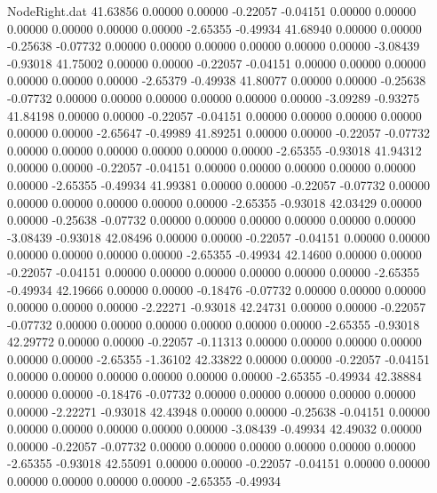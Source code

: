 \begin{filecontents}{NodeRight.dat}
  41.63856    0.00000    0.00000    -0.22057   -0.04151    0.00000    0.00000    0.00000    0.00000    0.00000    0.00000   -2.65355   -0.49934
  41.68940    0.00000    0.00000    -0.25638   -0.07732    0.00000    0.00000    0.00000    0.00000    0.00000    0.00000   -3.08439   -0.93018
  41.75002    0.00000    0.00000    -0.22057   -0.04151    0.00000    0.00000    0.00000    0.00000    0.00000    0.00000   -2.65379   -0.49938
  41.80077    0.00000    0.00000    -0.25638   -0.07732    0.00000    0.00000    0.00000    0.00000    0.00000    0.00000   -3.09289   -0.93275
  41.84198    0.00000    0.00000    -0.22057   -0.04151    0.00000    0.00000    0.00000    0.00000    0.00000    0.00000   -2.65647   -0.49989
  41.89251    0.00000    0.00000    -0.22057   -0.07732    0.00000    0.00000    0.00000    0.00000    0.00000    0.00000   -2.65355   -0.93018
  41.94312    0.00000    0.00000    -0.22057   -0.04151    0.00000    0.00000    0.00000    0.00000    0.00000    0.00000   -2.65355   -0.49934
  41.99381    0.00000    0.00000    -0.22057   -0.07732    0.00000    0.00000    0.00000    0.00000    0.00000    0.00000   -2.65355   -0.93018
  42.03429    0.00000    0.00000    -0.25638   -0.07732    0.00000    0.00000    0.00000    0.00000    0.00000    0.00000   -3.08439   -0.93018
  42.08496    0.00000    0.00000    -0.22057   -0.04151    0.00000    0.00000    0.00000    0.00000    0.00000    0.00000   -2.65355   -0.49934
  42.14600    0.00000    0.00000    -0.22057   -0.04151    0.00000    0.00000    0.00000    0.00000    0.00000    0.00000   -2.65355   -0.49934
  42.19666    0.00000    0.00000    -0.18476   -0.07732    0.00000    0.00000    0.00000    0.00000    0.00000    0.00000   -2.22271   -0.93018
  42.24731    0.00000    0.00000    -0.22057   -0.07732    0.00000    0.00000    0.00000    0.00000    0.00000    0.00000   -2.65355   -0.93018
  42.29772    0.00000    0.00000    -0.22057   -0.11313    0.00000    0.00000    0.00000    0.00000    0.00000    0.00000   -2.65355   -1.36102
  42.33822    0.00000    0.00000    -0.22057   -0.04151    0.00000    0.00000    0.00000    0.00000    0.00000    0.00000   -2.65355   -0.49934
  42.38884    0.00000    0.00000    -0.18476   -0.07732    0.00000    0.00000    0.00000    0.00000    0.00000    0.00000   -2.22271   -0.93018
  42.43948    0.00000    0.00000    -0.25638   -0.04151    0.00000    0.00000    0.00000    0.00000    0.00000    0.00000   -3.08439   -0.49934
  42.49032    0.00000    0.00000    -0.22057   -0.07732    0.00000    0.00000    0.00000    0.00000    0.00000    0.00000   -2.65355   -0.93018
  42.55091    0.00000    0.00000    -0.22057   -0.04151    0.00000    0.00000    0.00000    0.00000    0.00000    0.00000   -2.65355   -0.49934

\end{filecontents}
